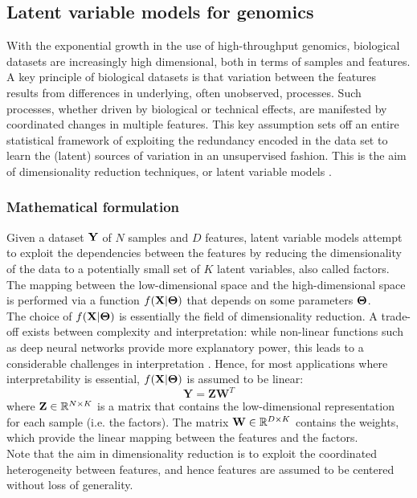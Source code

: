 
\subsection{Latent variable models for genomics}

With the exponential growth in the use of high-throughput genomics, biological datasets are increasingly high dimensional, both in terms of samples and features. A key principle of biological datasets is that variation between the features results from differences in underlying, often unobserved, processes. Such processes, whether driven by biological or technical effects, are manifested by coordinated changes in multiple features. This key assumption sets off an entire statistical framework of exploiting the redundancy encoded in the data set to learn the (latent) sources of variation in an unsupervised fashion. This is the aim of dimensionality reduction techniques, or latent variable models \cite{Komili2008, Stegle2012, Leek2007, Pournara2007, Dai2017, Genevieve2018, Meng2016}.


\subsubsection{Mathematical formulation}

Given a dataset ${\bf Y}$ of $N$ samples and $D$ features, latent variable models attempt to exploit the dependencies between the features by reducing the dimensionality of the data to a potentially small set of $K$ latent variables, also called factors. The mapping between the low-dimensional space and the high-dimensional space is performed via a function $f({\bf X}|\mbox{\boldmath $\Theta$})$ that depends on some parameters $\mbox{\boldmath $\Theta$}$.\\
The choice of $f({\bf X}|\mbox{\boldmath $\Theta$})$ is essentially the field of dimensionality reduction. A trade-off exists between complexity and interpretation: while non-linear functions such as deep neural networks provide more explanatory power, this leads to a considerable challenges in interpretation \cite{Zhang2018_NN}. Hence, for most applications where interpretability is essential, $f({\bf X}|\mbox{\boldmath $\Theta$})$ is assumed to be linear:
\begin{equation} \label{eq:linear_model}
	\mathbf{Y} = \mathbf{Z}\mathbf{W}^{T}
\end{equation}
where ${\bf Z} \in \mathbb{R}^{N \times K}$ is a matrix that contains the low-dimensional representation for each sample (i.e. the factors). The matrix ${\bf W} \in \mathbb{R}^{D \times K}$ contains the weights, which provide the linear mapping between the features and the factors.\\
Note that the aim in dimensionality reduction is to exploit the coordinated heterogeneity between features, and hence features are assumed to be centered without loss of generality.

